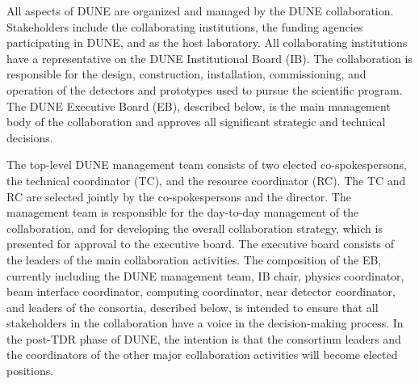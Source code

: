 All aspects of DUNE are organized and managed by the DUNE collaboration.  Stakeholders include the collaborating institutions, the funding agencies participating in DUNE, and \fnal as the host laboratory.  All collaborating institutions have a representative on the DUNE Institutional Board (IB). The collaboration is responsible for the design, construction, installation, commissioning, and operation of the detectors and prototypes used to pursue the scientific program. The DUNE Executive Board (EB), described below, is the main management body of the collaboration and approves all significant strategic and technical decisions.

The top-level DUNE management team consists of two elected co-spokespersons, the technical coordinator (TC), and the resource coordinator (RC). The TC and RC are selected jointly by the co-spokespersons and the \fnal director. The management team is responsible for the day-to-day management of the collaboration, and for developing the overall collaboration strategy, which is presented for approval to the executive board. The executive board consists of the leaders of the main collaboration activities. The composition of the EB, currently including the DUNE management team, IB chair, physics coordinator, beam interface coordinator, computing coordinator, near detector coordinator, and leaders of the  consortia, described below, is intended to ensure
that all stakeholders in the collaboration have a voice in the decision-making process. 
In the post-TDR phase of DUNE, the intention is that the consortium leaders and the coordinators of the other major collaboration activities will become elected positions.

